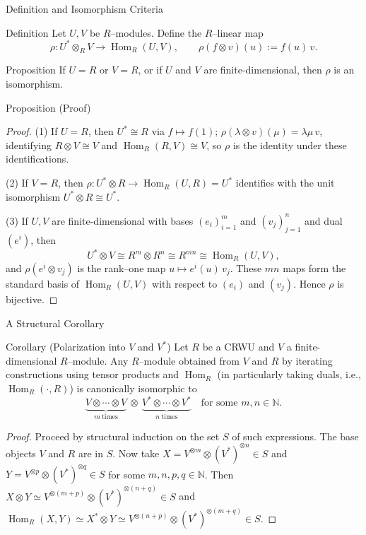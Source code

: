 \begin{frame}{Definition and Isomorphism Criteria}
\begin{block}{Definition}
Let $U,V$ be $R$–modules. Define the $R$–linear map
\[
\rho: U^*\otimes_R V \longrightarrow \operatorname{Hom}_R(U,V),\qquad
\rho(f\otimes v)(u):= f(u)\,v.
\]
\end{block}

\begin{block}{Proposition}
If $U=R$ or $V=R$, or if $U$ and $V$ are finite-dimensional, then $\rho$ is an isomorphism.
\end{block}
\end{frame}

\begin{frame}{Proposition (Proof)}

\begin{proof}
(1) If $U=R$, then $U^*\cong R$ via $f\mapsto f(1)$; $\rho(\lambda\otimes v)(\mu)=\lambda\mu\, v$, identifying $R\otimes V\cong V$ and $\operatorname{Hom}_R(R,V)\cong V$, so $\rho$ is the identity under these identifications.

(2) If $V=R$, then $\rho:U^*\otimes R\to \operatorname{Hom}_R(U,R)=U^*$ identifies with the unit isomorphism $U^*\otimes R\cong U^*$.

(3) If $U,V$ are finite-dimensional with bases $(e_i)_{i=1}^m$ and $(v_j)_{j=1}^n$ and dual $(e^i)$, then
\[
U^*\otimes V \cong R^{m}\otimes R^{n}\cong R^{mn}\cong \operatorname{Hom}_R(U,V),
\]
and $\rho(e^i\otimes v_j)$ is the rank–one map $u\mapsto e^i(u)\,v_j$. These $mn$ maps form the standard basis of $\operatorname{Hom}_R(U,V)$ with respect to $(e_i)$ and $(v_j)$. Hence $\rho$ is bijective.
\end{proof}
\end{frame}

\begin{frame}{A Structural Corollary}
\vspace{-0.3cm}
\begin{block}{Corollary (Polarization into $V$ and $V^*$)}
Let $R$ be a CRWU and $V$ a finite-dimensional $R$–module.
Any $R$–module obtained from $V$ and $R$ by iterating constructions using
tensor products and $\operatorname{Hom}_R$
(in particularly taking duals, i.e., $\operatorname{Hom}_R(\cdot, R)$)
is canonically isomorphic to
\[
\underbrace{V\otimes\cdots\otimes V}_{m\ \text{times}}\ \otimes\
\underbrace{V^*\otimes\cdots\otimes V^*}_{n\ \text{times}}
\quad\text{for some }m,n\in\mathbb{N}.
\]
\end{block}
\vspace{-0.3cm}
\begin{proof}
Proceed by structural induction on the set $S$ of such expressions.
The base objects $V$ and $R$ are in $S$.
Now take
$X = V^{\otimes m} \otimes (V^*)^{\otimes n} \in S$ and
$Y = V^{\otimes p} \otimes (V^*)^{\otimes q} \in S$
for some $m, n, p, q \in \mathbb{N}$.
Then
$X \otimes Y \simeq V^{\otimes (m + p)} \otimes (V^*)^{\otimes (n + q)} \in S$
and
$\operatorname{Hom}_R(X, Y) \simeq X^* \otimes Y
\simeq V^{\otimes (n + p)} \otimes (V^*)^{\otimes (m + q)} \in S$.
\end{proof}
\end{frame}

